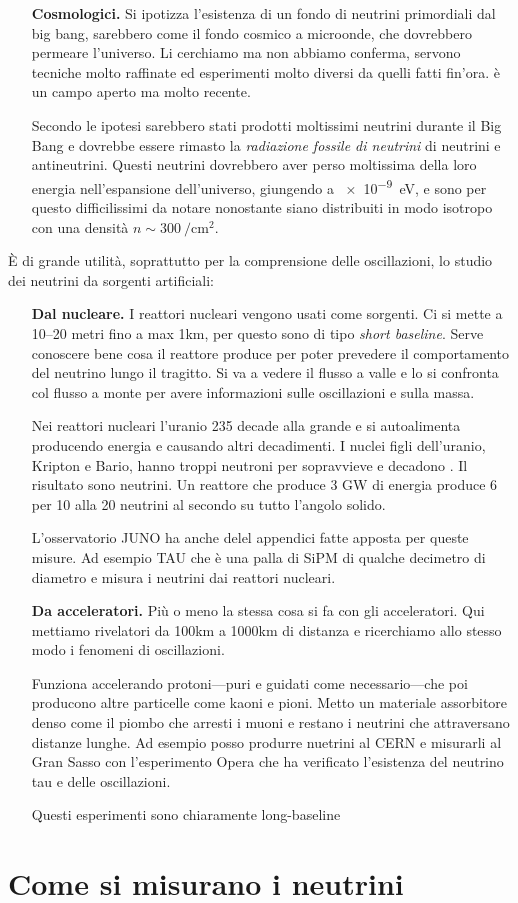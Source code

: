 \begin{enumerate}
                \item[\textbf{Cosmologici.}] Si ipotizza l'esistenza di un fondo di neutrini primordiali dal big bang, sarebbero come il fondo cosmico a microonde, che dovrebbero permeare l'universo. Li cerchiamo ma non abbiamo conferma, servono tecniche molto raffinate ed esperimenti molto diversi da quelli fatti fin'ora. è un campo aperto ma molto recente.
                 
                Secondo le ipotesi sarebbero stati prodotti moltissimi neutrini durante il Big Bang e dovrebbe essere rimasto la \emph{radiazione fossile di neutrini} di neutrini e antineutrini. Questi neutrini dovrebbero aver perso moltissima della loro energia nell'espansione dell'universo, giungendo a \SI{e-9}{\eV}, e sono per questo difficilissimi da notare nonostante siano distribuiti in modo isotropo con una densità $n \sim \SI{300}{\per\centi\meter\squared}$.
            \end{enumerate}
            È di grande utilità, soprattutto per la comprensione delle oscillazioni, lo studio dei neutrini da sorgenti artificiali:
            \begin{enumerate}
                \item[\textbf{Dal nucleare.}] I reattori nucleari vengono usati come sorgenti. Ci si mette a 10--20 metri fino a max 1km, per questo sono di tipo \textit{short baseline}. Serve conoscere bene cosa il reattore produce per poter prevedere il comportamento del neutrino lungo il tragitto. Si va a vedere il flusso a valle e lo si confronta col flusso a monte per avere informazioni sulle oscillazioni e sulla massa.
                
                Nei reattori nucleari l'uranio 235 decade alla grande e si autoalimenta producendo energia e causando altri decadimenti. I nuclei figli dell'uranio, Kripton e Bario, hanno troppi neutroni per sopravvieve e decadono \betap. Il risultato sono neutrini. Un reattore che produce 3 GW di energia produce 6 per 10 alla 20 neutrini al secondo su tutto l'angolo solido.

                L'osservatorio JUNO ha anche delel appendici fatte apposta per queste misure. Ad esempio TAU che è una palla di SiPM di qualche decimetro di diametro e misura i neutrini dai reattori nucleari.
                
                \item[\textbf{Da acceleratori.}] Più o meno la stessa cosa si fa con gli acceleratori. Qui mettiamo rivelatori da 100km a 1000km di distanza e ricerchiamo allo stesso modo i fenomeni di oscillazioni.
                
                Funziona accelerando protoni---puri e guidati come necessario---che poi producono altre particelle come kaoni e pioni. Metto un materiale assorbitore denso come il piombo che arresti i muoni e restano i neutrini che attraversano distanze lunghe. Ad esempio posso produrre nuetrini al CERN e misurarli al Gran Sasso con l'esperimento Opera che ha verificato l'esistenza del neutrino tau e delle oscillazioni.

                Questi esperimenti sono chiaramente long-baseline
            \end{enumerate}
                
    \section{Come si misurano i neutrini}